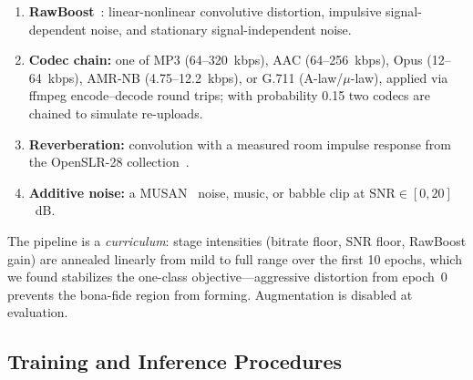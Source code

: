 \begin{enumerate}
    \item \textbf{RawBoost}~\cite{tak2022rawboost}: linear-nonlinear convolutive
        distortion, impulsive signal-dependent noise, and stationary signal-independent
        noise.
    \item \textbf{Codec chain:} one of MP3 (64--320~kbps), AAC (64--256~kbps), Opus
        (12--64~kbps), AMR-NB (4.75--12.2~kbps), or G.711 (A-law/$\mu$-law), applied via
        ffmpeg encode--decode round trips; with probability 0.15 two codecs are chained
        to simulate re-uploads.
    \item \textbf{Reverberation:} convolution with a measured room impulse response
        from the OpenSLR-28 collection~\cite{ko2017rir}.
    \item \textbf{Additive noise:} a MUSAN~\cite{snyder2015musan} noise, music, or
        babble clip at $\mathrm{SNR} \in [0, 20]$~dB.
\end{enumerate}

The pipeline is a \emph{curriculum}: stage intensities (bitrate floor, SNR floor,
RawBoost gain) are annealed linearly from mild to full range over the first 10 epochs,
which we found stabilizes the one-class objective---aggressive distortion from epoch~0
prevents the bona-fide region from forming. Augmentation is disabled at evaluation.

\subsection{Training and Inference Procedures}
\label{ssec:trainproc}

\begin{algorithm}[t]
\caption{AuralGuard training (one epoch)}
\label{alg:training}
\footnotesize
{}
\end{algorithm}

